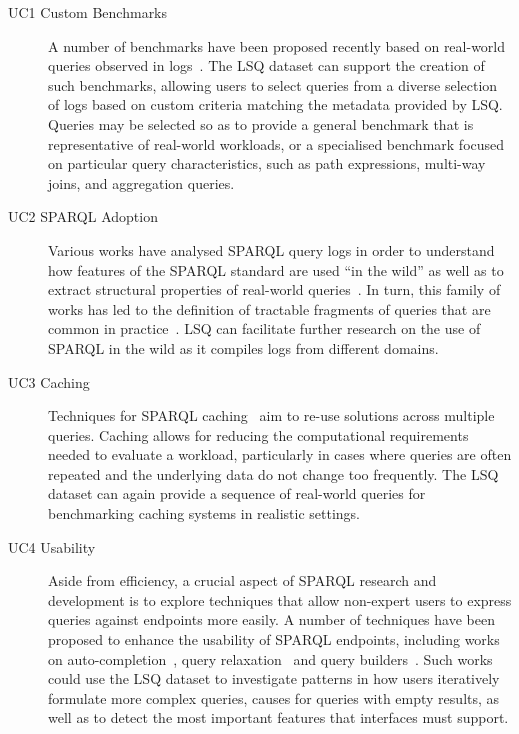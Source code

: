 \begin{description}
\item[UC1 Custom Benchmarks] A number of benchmarks have been proposed recently based on real-world queries observed in logs~\cite{MorseyLAN11,BailAPWHGG12,WuFYBY14,SaleemMN15}. The LSQ dataset can support the creation of such benchmarks, allowing users to select queries from a diverse selection of logs based on custom criteria matching the metadata provided by LSQ. Queries may be selected so as to provide a general benchmark that is representative of real-world workloads, or a specialised benchmark focused on particular query characteristics, such as path expressions, multi-way joins, and aggregation queries.
\item[UC2 SPARQL Adoption] Various works have analysed SPARQL query logs in order to understand how features of the SPARQL standard are used ``in the wild'' as well as to extract structural properties of real-world queries~\cite{AriasFMF11,PicalausaV11,Rietveld14,BonifatiMT17,MalyshevKGGB18,BonifatiMT19,BonifatiMT20}. In turn, this family of works has led to the definition of tractable fragments of queries that are common in practice~\cite{MartensT18,BonifatiDFHHMMSST21}. LSQ can facilitate further research on the use of SPARQL in the wild as it compiles logs from different domains.
\item[UC3 Caching] Techniques for SPARQL caching~\cite{MartinUA10,WilliamsW11,LampoVDR11,PapailiouTKK15} aim to re-use solutions across multiple queries. Caching allows for reducing the computational requirements needed to evaluate a workload, particularly in cases where queries are often repeated and the underlying data do not change too frequently. The LSQ dataset can again provide a sequence of real-world queries for benchmarking caching systems in realistic settings.
\item[UC4 Usability] Aside from efficiency, a crucial aspect of SPARQL research and development is to explore techniques that allow non-expert users to express queries against endpoints more easily. A number of techniques have been proposed to enhance the usability of SPARQL endpoints, including works on auto-completion~\cite{LehmannB11,RietveldH14,Campinas14}, query relaxation~\cite{HoganMPS12,FrosiniCPW17,VirgilioMT15} and query builders~\cite{AmbrusMH10,HogenboomMFK10,ClemmerD11,VargasAHL19}. Such works could use the LSQ dataset to investigate patterns in how users iteratively formulate more complex queries, causes for queries with empty results, as well as to detect the most important features that interfaces must support. 

\end{description}
